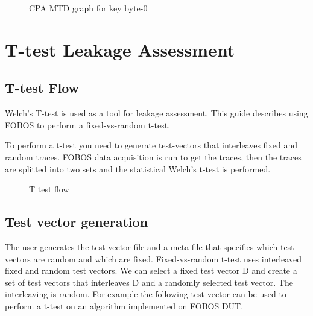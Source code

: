 \documentclass[letterpaper,10pt,english]{sphinxmanual}
\let\sphinxpxdimen\pdfpxdimen\else\newdimen\sphinxpxdimen
\begin{document}
\begin{figure}[htbp]
\centering
\capstart

\noindent\sphinxincludegraphics[height=350\sphinxpxdimen]{{cpa_MTD}.png}
\caption{CPA MTD graph for key byte-0}\label{\detokenize{aes_cpa_example2:id3}}\end{figure}


\chapter{T-test Leakage Assessment}
\label{\detokenize{t_test:t-test-leakage-assessment}}\label{\detokenize{t_test::doc}}

\section{T-test Flow}
\label{\detokenize{t_test:t-test-flow}}
Welch’s T-test is used as a tool for leakage assessment. This guide describes using FOBOS to perform a fixed-vs-random t-test.

To perform a t-test you need to generate test-vectors that interleaves fixed and random traces.
FOBOS data acquisition is run to get the traces, then the traces are splitted into two sets and the statistical Welch’s t-test is performed.

\begin{figure}[htbp]
\centering
\capstart

\noindent{}
\caption{T test flow}\label{\detokenize{t_test:id1}}\end{figure}


\section{Test vector generation}
\label{\detokenize{t_test:test-vector-generation}}
The user generates the test-vector file and a meta file that specifies which test vectors are random and which are fixed.
Fixed-vs-random t-test uses interleaved fixed and random test vectors. We can select a fixed test vector D and create a set of test vectors that  interleaves D and a randomly selected test vector. The interleaving is random.
For example the following test vector can be used to perform a t-test on an algorithm implemented on FOBOS DUT.
\end{document}
